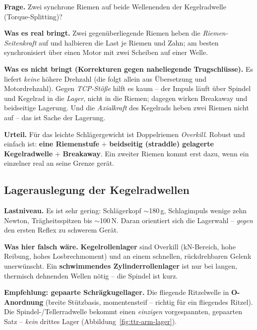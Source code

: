 \textbf{Frage.} Zwei synchrone Riemen auf beide Wellenenden der Kegelradwelle
(Torque-Splitting)?

\textbf{Was es real bringt.} Zwei gegen\"uberliegende Riemen heben die
\emph{Riemen-Seitenkraft} auf und halbieren die Last je Riemen und Zahn; am besten
synchronisiert \"uber einen Motor mit zwei Scheiben auf einer Welle.

\textbf{Was es nicht bringt (Korrekturen gegen naheliegende Trugschl\"usse).} Es
liefert \emph{keine} h\"ohere Drehzahl (die folgt allein aus \"Ubersetzung und
Motordrehzahl). Gegen \emph{TCP-St\"o\ss e} hilft es kaum -- der Impuls l\"auft
\"uber Spindel und Kegelrad in die \emph{Lager}, nicht in die Riemen; dagegen
wirken Breakaway und beidseitige Lagerung. Und die \emph{Axialkraft} des Kegelrads
heben zwei Riemen nicht auf -- das ist Sache der Lagerung.

\textbf{Urteil.} F\"ur das leichte Schl\"agergewicht ist Doppelriemen
\emph{Overkill}. Robust und einfach ist: \textbf{eine Riemenstufe} $+$
\textbf{beidseitig (straddle) gelagerte Kegelradwelle} $+$ \textbf{Breakaway}. Ein
zweiter Riemen kommt erst dazu, wenn ein einzelner real an seine Grenze ger\"at.

\subsection{Lagerauslegung der Kegelradwellen}
\label{sec:ttr-arm-lager}

\textbf{Lastniveau.} Es ist sehr gering: Schl\"agerkopf $\sim$180\,g, Schlagimpuls
wenige zehn Newton, Tr\"agheitsspitzen bis $\sim$100\,N. Daran orientiert sich die
Lagerwahl -- \emph{gegen} den ersten Reflex zu \glqq schwerem\grqq{} Ger\"at.

\textbf{Was hier falsch w\"are.} \textbf{Kegelrollenlager} sind Overkill
(kN-Bereich, hohe Reibung, hohes Losbrechmoment) und an einem schnellen,
r\"uckdrehbaren Gelenk unerw\"unscht. Ein \textbf{schwimmendes
Zylinderrollenlager} ist nur bei langen, thermisch dehnenden Wellen n\"otig -- die
Spindel ist kurz.

\textbf{Empfehlung: gepaarte Schr\"agkugellager.} Die fliegende Ritzelwelle in
\textbf{O-Anordnung} (breite St\"utzbasis, momentensteif -- richtig f\"ur ein
fliegendes Ritzel). Die Spindel-/Tellerradwelle bekommt einen \emph{einzigen}
vorgespannten, gepaarten Satz -- \emph{kein} drittes Lager
(Abbildung~\ref{fig:ttr-arm-lager}).

